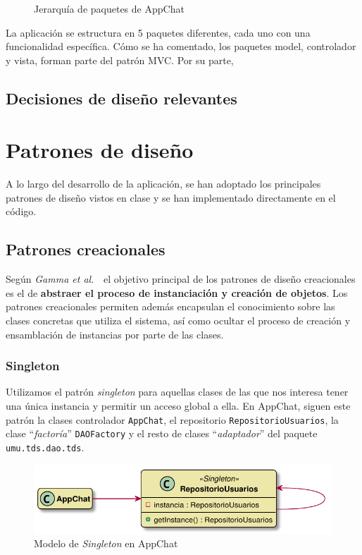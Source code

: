 \documentclass[11pt]{article}
\begin{document}
\begin{figure}[H]
	\centering
	\caption{Jerarquía de paquetes de AppChat}
	\label{fig:paquetes}
\end{figure}

La aplicación se estructura en 5 paquetes diferentes, cada uno con una funcionalidad específica. Cómo se ha comentado, los paquetes model, controlador y vista, forman parte del patrón MVC. Por su parte, 

\subsection{Decisiones de diseño relevantes}

\section{Patrones de diseño}

A lo largo del desarrollo de la aplicación, se han adoptado los principales patrones de diseño vistos en clase y se han implementado directamente en el código.

\subsection{Patrones creacionales}

Según \textit{Gamma et al}.~\cite{book:204958}\ el objetivo principal de los patrones de diseño creacionales es el de \textbf{abstraer el proceso de instanciación y creación de objetos}. Los patrones creacionales permiten además encapsulan el conocimiento sobre las clases concretas que utiliza el sistema, así como ocultar el proceso de creación y ensamblación de instancias por parte de las clases.

\subsubsection*{Singleton}

Utilizamos el patrón \textit{singleton} para aquellas clases de las que nos interesa tener una única instancia y permitir un acceso global a ella. En AppChat, siguen este patrón la clases controlador \texttt{AppChat}, el repositorio \texttt{RepositorioUsuarios}, la clase ``\textit{factoría}'' \texttt{DAOFactory} y el resto de clases ``\textit{adaptador}'' del paquete \texttt{umu.tds.dao.tds}.

\begin{figure}[H]
	\centering
	\includegraphics[width=0.6\linewidth]{figures/singleton_model}
	\caption{Modelo de \textit{Singleton} en AppChat}
	\label{fig:singleton}
\end{figure}
\end{document}
